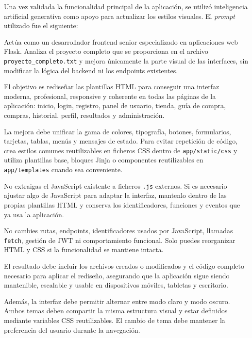 Una vez validada la funcionalidad principal de la aplicación, se utilizó inteligencia artificial generativa como apoyo para actualizar los estilos visuales. El \textit{prompt} utilizado fue el siguiente:
\begin{promptbox}
	Actúa como un desarrollador frontend senior especializado en aplicaciones web Flask. Analiza el proyecto completo que se proporciona en el archivo \texttt{proyecto\_completo.txt} y mejora únicamente la parte visual de las interfaces, sin modificar la lógica del backend ni los endpoints existentes.
	
	El objetivo es rediseñar las plantillas HTML para conseguir una interfaz moderna, profesional, responsive y coherente en todas las páginas de la aplicación: inicio, login, registro, panel de usuario, tienda, guía de compra, compras, historial, perfil, resultados y administración.
	
	La mejora debe unificar la gama de colores, tipografía, botones, formularios, tarjetas, tablas, menús y mensajes de estado. Para evitar repetición de código, crea estilos comunes reutilizables en ficheros CSS dentro de \texttt{app/static/css} y utiliza plantillas base, bloques Jinja o componentes reutilizables en \texttt{app/templates} cuando sea conveniente.
	
	No extraigas el JavaScript existente a ficheros \texttt{.js} externos. Si es necesario ajustar algo de JavaScript para adaptar la interfaz, mantenlo dentro de las propias plantillas HTML y conserva los identificadores, funciones y eventos que ya usa la aplicación.
	
	No cambies rutas, endpoints, identificadores usados por JavaScript, llamadas \texttt{fetch}, gestión de JWT ni comportamiento funcional. Solo puedes reorganizar HTML y CSS si la funcionalidad se mantiene intacta.
	
	El resultado debe incluir los archivos creados o modificados y el código completo necesario para aplicar el rediseño, asegurando que la aplicación sigue siendo mantenible, escalable y usable en dispositivos móviles, tabletas y escritorio.
	
	Además, la interfaz debe permitir alternar entre modo claro y modo oscuro. Ambos temas deben compartir la misma estructura visual y estar definidos mediante variables CSS reutilizables. El cambio de tema debe mantener la preferencia del usuario durante la navegación.
\end{promptbox}